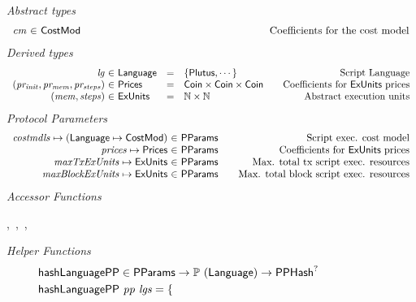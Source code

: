 \begin{figure*}[htb]
  \emph{Abstract types}
  \begin{equation*}
    \begin{array}{r@{~\in~}l@{\qquad\qquad\qquad\qquad\qquad\qquad\qquad\qquad\qquad}r}
      \var{cm} & \CostMod & \text{Coefficients for the cost model} \\
    \end{array}
  \end{equation*}
  \emph{Derived types}
  \begin{equation*}
    \begin{array}{r@{~\in~}l@{\quad=\quad}l@{\qquad}r}
      \var{lg}
      & \Language
      & \{\Plutus, \dotsb\}
      & \text{Script Language}
      \\
      \var{(pr_{init}, pr_{mem}, pr_{steps})}
      & \Prices
      & \Coin \times \Coin \times \Coin
      & \text {Coefficients for $\ExUnits$ prices}
      \\
      \var{(mem, steps)}
      & \ExUnits
      & \N \times \N
      & \text{Abstract execution units} \\
    \end{array}
  \end{equation*}
  \emph{Protocol Parameters}
  \begin{equation*}
      \begin{array}{r@{~\in~}l@{\qquad}r}
        \var{costmdls} \mapsto (\Language \mapsto \CostMod) & \PParams & \text{Script exec. cost model}\\
        \var{prices} \mapsto \Prices & \PParams & \text{Coefficients for $\ExUnits$ prices} \\
        \var{maxTxExUnits} \mapsto \ExUnits & \PParams & \text{Max. total tx script exec. resources}\\
        \var{maxBlockExUnits} \mapsto \ExUnits & \PParams & \text{Max. total block script exec. resources}\\
      \end{array}
  \end{equation*}
  \emph{Accessor Functions}
  \begin{center}
  ,~,~,~
  \end{center}
  \emph{Helper Functions}
  \begin{align*}
    & \mathsf{hashLanguagePP} \in \mathsf{PParams} \to \mathbb{P}~(\mathsf{Language}) \to \mathsf{PPHash}^?   \\
    & \mathsf{hashLanguagePP}~\mathit{pp}~\mathit{lgs} = \begin{cases}

\end{cases}
\end{align*}
\end{figure*}
